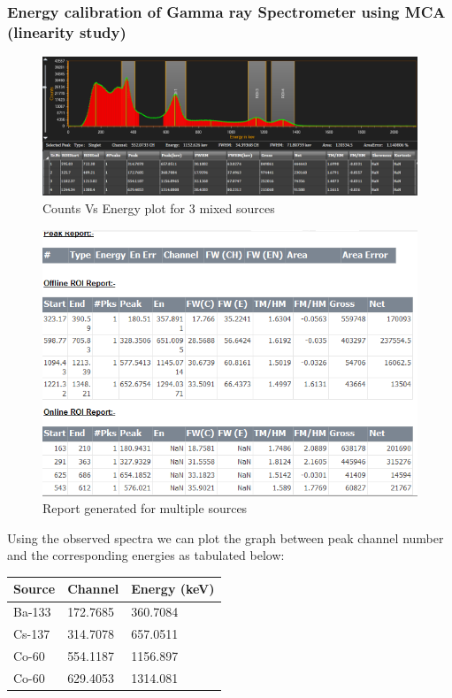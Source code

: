 \documentclass[%
 reprint,
nofootinbib,
 amsmath,amssymb,
 aps,
floatfix,
]{revtex4-2}
\begin{document}
\subsubsection*{Energy calibration of Gamma ray Spectrometer using MCA (linearity study)}
\begin{figure}[H]
    \centering
    \includegraphics[width = 8 cm]{Figures/Multiple sources.png}
    \caption{Counts Vs Energy plot for 3 mixed sources}
    \label{fig:my_label}
\end{figure}
\begin{figure}
    \centering
    \includegraphics[scale = 0.3]{Figures/Threesources_report.PNG}
    \caption{Report generated for multiple sources}
    \label{fig:my_label}
\end{figure}
Using the observed spectra we can plot the graph between peak channel number and the corresponding energies as tabulated below:
\begin{longtable}[c]{|l|l|l|}
\hline
\textbf{Source} & \textbf{Channel} & \textbf{Energy (keV)} \\ \hline
\endfirsthead
%
\endhead
%
Ba-133 & 172.7685 & 360.7084 \\ \hline
Cs-137 & 314.7078 & 657.0511 \\ \hline
Co-60 & 554.1187 & 1156.897 \\ \hline
Co-60 & 629.4053 & 1314.081 \\ \hline
\end{longtable}
\end{document}

